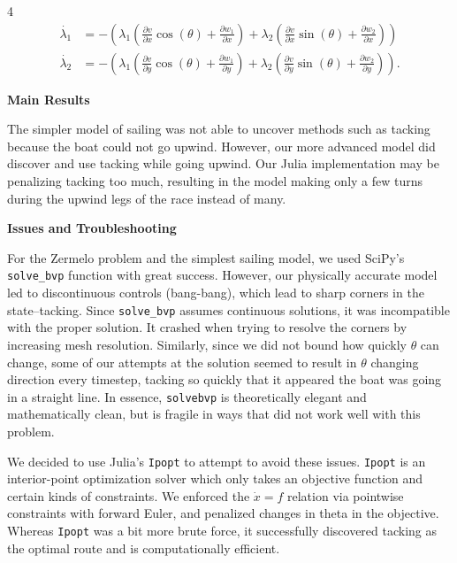 \documentclass[a0]{a0poster}
\newcommand{\NumColumns}{4}
\begin{document}
\begin{minipage}{\linewidth}
\begin{multicols*}{\NumColumns}
$$
\begin{aligned}
\dot{\lambda_1} & = - \left ( \lambda_1 \left ( \frac{\partial v}{\partial x} \cos(\theta) + \frac{\partial w_1}{\partial x} \right ) + \lambda_2 \left ( \frac{\partial v}{\partial x} \sin(\theta) + \frac{\partial w_2}{\partial x} \right ) \right ) \\
\dot{\lambda_2} & = - \left ( \lambda_1 \left ( \frac{\partial v}{\partial y} \cos(\theta) + \frac{\partial w_1}{\partial y} \right ) + \lambda_2 \left ( \frac{\partial v}{\partial y} \sin(\theta) + \frac{\partial w_2}{\partial y} \right ) \right ).
\end{aligned}
$$



\begin{center}
\LARGE{\textbf{Main Results}}
\end{center}

\large The simpler model of sailing was not able to uncover methods such as tacking because the boat could not go upwind. However, our more advanced model did discover and use tacking while going upwind. Our Julia implementation may be penalizing tacking too much, resulting in the model making only a few turns during the upwind legs of the race instead of many.

\begin{center}
\LARGE{\textbf{Issues and Troubleshooting}}
\end{center}

\large For the Zermelo problem and the simplest sailing model, we used SciPy's \verb|solve_bvp| function with great success. However, our physically accurate model led to discontinuous controls (bang-bang), which lead to sharp corners in the state--tacking. Since \verb|solve_bvp| assumes continuous solutions, it was incompatible with the proper solution. It crashed when trying to resolve the corners by increasing mesh resolution. Similarly, since we did not bound how quickly $\theta$ can change, some of our attempts at the solution seemed to result in $\theta$ changing direction every timestep, tacking so quickly that it appeared the boat was going in a straight line. In essence, \verb|solvebvp| is theoretically elegant and mathematically clean, but is fragile in ways that did not work well with this problem.

\large We decided to use Julia's \verb|Ipopt| to attempt to avoid these issues. \verb|Ipopt| is an interior-point optimization solver which only takes an objective function and certain kinds of constraints. We enforced the $\dot{x} = f$ relation via pointwise constraints with forward Euler, and penalized changes in theta in the objective. Whereas \verb|Ipopt| was a bit more brute force, it successfully discovered tacking as the optimal route and is computationally efficient.


\end{multicols*}
\end{minipage}
\end{document}
